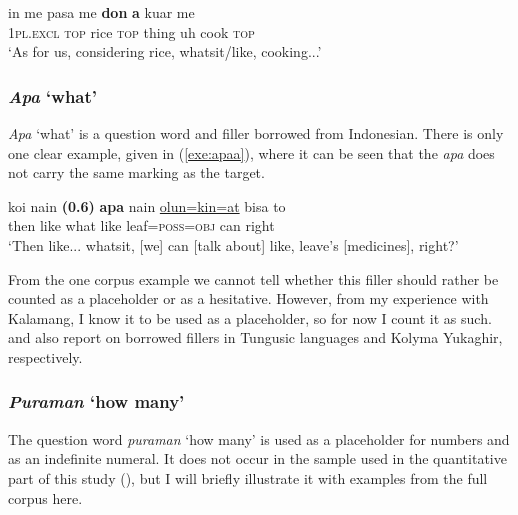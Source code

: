 \documentclass[output=paper,colorlinks,citecolor=brown
\ChapterDOI{10.5281/zenodo.15697587}
]{langscibook}
\begin{document}
\begin{exe}
    \ex \gll in me pasa me \textbf{don} \textbf{a} kuar me\\
    \textsc{1pl.excl} \textsc{top} rice \textsc{top} thing uh cook \textsc{top}\\
    \glt `As for us, considering rice, whatsit/like, cooking...' 
    \label{exe:dona}
\end{exe}

\subsubsection{\textit{Apa} `what'}
\textit{Apa} `what' is a question word and filler borrowed from Indonesian. There is only one clear example, given in (\ref{exe:apaa}), where it can be seen that the \textit{apa} does not carry the same marking as the target.

\begin{exe}
    \ex \gll koi nain \textbf{(0.6)} \textbf{apa} nain \uline{olun=kin=at} bisa to\\
    then like {} what like leaf=\textsc{poss=obj} can right\\
    \glt `Then like... whatsit, [we] can [talk about] like, leave's [medicines], right?'  
    \label{exe:apaa}
\end{exe}

From the one corpus example we cannot tell whether this filler should rather be counted as a placeholder or as a hesitative. However, from my experience with Kalamang, I know it to be used as a placeholder, so for now I count it as such. \citet{chapters/klyachko} and \citet{chapters/ventayol_boada} also report on borrowed fillers in Tungusic languages and Kolyma Yukaghir, respectively.

\subsubsection{\textit{Puraman} `how many'}
\label{sec:puraman}
The question word \textit{puraman} `how many' is used as a placeholder for numbers and as an indefinite numeral. It does not occur in the sample used in the quantitative part of this study (), but I will briefly illustrate it with examples from the full corpus here. 
\end{document}
